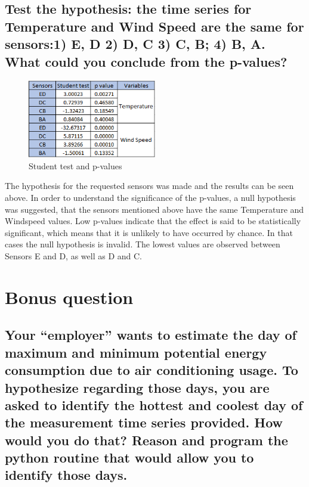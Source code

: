 \documentclass[a4paper,12pt]{article} %
\begin{document}
\subsection{Test the hypothesis: the time series for Temperature and Wind Speed are the same for sensors:1) E, D 2) D, C 3) C, B; 4) B, A. What could you conclude from the p-values?}

\begin{figure}[H] %
	\centering %
	\includegraphics[width=0.5\textwidth]{T_test.png} 
	\caption{Student test and p-values} %
\end{figure}

The hypothesis for the requested sensors was made and the results can be seen above. In order to understand the significance of the p-values, a null hypothesis was suggested, that the sensors mentioned above have the same Temperature and Windspeed values. Low p-values indicate that the effect is said to be statistically
significant, which means that it is unlikely to have occurred by chance. In that cases the null hypothesis is invalid. The lowest values are observed between Sensors E and D, as well as D and C.

\section {Bonus question}

\subsection {Your “employer” wants to estimate the day of maximum and minimum potential energy consumption due to air conditioning usage. To hypothesize regarding those days, you are asked to identify the hottest and coolest day of the measurement time series provided. How would you do that? Reason and program the python routine that would allow you to identify those days.}
\end{document}
